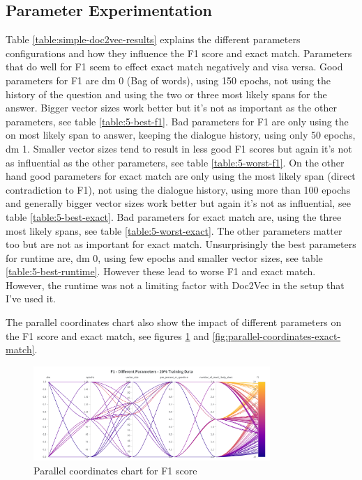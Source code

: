 \documentclass[11pt]{article}
\begin{document}
    \subsection{Parameter Experimentation}\label{subsec:experimentation-results}

    Table \ref{table:simple-doc2vec-results} explains the different parameters configurations and how they influence
    the F1 score and exact match. Parameters that do well for F1 seem to effect exact match negatively and
    visa versa. Good parameters for F1 are dm 0 (Bag of words), using 150 epochs, not using the history of the question
    and using the two or three most likely spans for the answer. Bigger vector sizes work better but it's not as
    important as the other parameters, see table \ref{table:5-best-f1}. Bad parameters for F1 are only using the on most likely span to answer,
    keeping the dialogue history, using only 50 epochs, dm 1. Smaller vector sizes tend to result in less good F1 scores
    but again it's not as influential as the other parameters, see table \ref{table:5-worst-f1}. On the other hand good parameters for exact match are
    only using the most likely span (direct contradiction to F1), not using the dialogue history,
    using more than 100 epochs and generally bigger vector sizes work better but again it's not as influential, see table
    \ref{table:5-best-exact}. Bad parameters
    for exact match are, using the three most likely spans, see table \ref{table:5-worst-exact}.
    The other parameters matter too but are not as important for exact match. Unsurprisingly the best parameters for runtime are,
    dm 0, using few epochs and smaller vector sizes, see table \ref{table:5-best-runtime}. However these lead to worse F1 and exact match. However, the
    runtime was not a limiting factor with Doc2Vec in the setup that I've used it.

    The parallel coordinates chart also show the impact of different parameters on the F1 score and
    exact match, see figures \ref{fig:parallel-coordinates-f1} and \ref{fig:parallel-coordinates-exact-match}.

    \begin{figure}[h]
        \centering
        \includegraphics[width=0.8\textwidth]{parallel-coordinates-F1}
        \caption{Parallel coordinates chart for F1 score}
        \label{fig:parallel-coordinates-f1}
    \end{figure}
\end{document}
